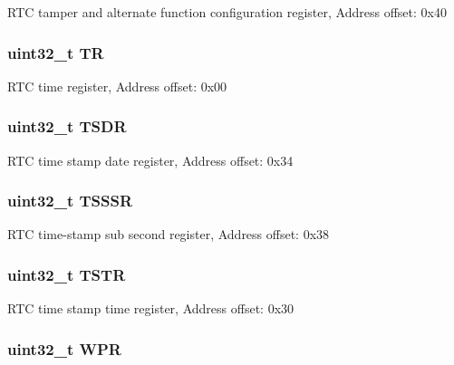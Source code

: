 R\-T\-C tamper and alternate function configuration register, Address offset\-: 0x40 \hypertarget{struct_r_t_c___type_def_a63d179b7a36a715dce7203858d3be132}{
\subsubsection[{T\-R}]{ uint32\-\_\-t T\-R}}\label{struct_r_t_c___type_def_a63d179b7a36a715dce7203858d3be132}
R\-T\-C time register, Address offset\-: 0x00 \hypertarget{struct_r_t_c___type_def_abeb6fb580a8fd128182aa9ba2738ac2c}{
\subsubsection[{T\-S\-D\-R}]{ uint32\-\_\-t T\-S\-D\-R}}\label{struct_r_t_c___type_def_abeb6fb580a8fd128182aa9ba2738ac2c}
R\-T\-C time stamp date register, Address offset\-: 0x34 \hypertarget{struct_r_t_c___type_def_a1d6c2bc4c067d6a64ef30d16a5925796}{
\subsubsection[{T\-S\-S\-S\-R}]{ uint32\-\_\-t T\-S\-S\-S\-R}}\label{struct_r_t_c___type_def_a1d6c2bc4c067d6a64ef30d16a5925796}
R\-T\-C time-\/stamp sub second register, Address offset\-: 0x38 \hypertarget{struct_r_t_c___type_def_a042059c8b4168681d6aecf30211dd7b8}{
\subsubsection[{T\-S\-T\-R}]{ uint32\-\_\-t T\-S\-T\-R}}\label{struct_r_t_c___type_def_a042059c8b4168681d6aecf30211dd7b8}
R\-T\-C time stamp time register, Address offset\-: 0x30 \hypertarget{struct_r_t_c___type_def_a6204786b050eb135fabb15784698e86e}{
\subsubsection[{W\-P\-R}]{ uint32\-\_\-t W\-P\-R}}\label{struct_r_t_c___type_def_a6204786b050eb135fabb15784698e86e}
